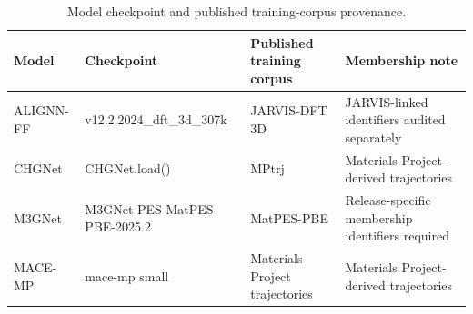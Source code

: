 \begin{table}[H]
\centering
\sitablefont
\caption{Model checkpoint and published training-corpus provenance.}
\label{tab:v3-training}
\begin{adjustbox}{max width=\linewidth}
\begin{tabular}{@{}P{0.11\textwidth}P{0.29\textwidth}P{0.22\textwidth}P{0.30\textwidth}@{}}
\toprule
Model & Checkpoint & Published training corpus & Membership note \\
\midrule
ALIGNN-FF & v12.2.2024\_dft\_3d\_307k & JARVIS-DFT 3D & JARVIS-linked identifiers audited separately \\
CHGNet & CHGNet.load() & MPtrj & Materials Project-derived trajectories \\
M3GNet & M3GNet-PES-\allowbreak MatPES-PBE-2025.2 & MatPES-PBE & Release-specific membership identifiers required \\
MACE-MP & mace-mp small & Materials Project trajectories & Materials Project-derived trajectories \\
\bottomrule
\end{tabular}
\end{adjustbox}
\end{table}
